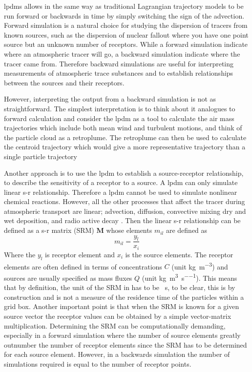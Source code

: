 \acrshort{lpdm}s allows in the same way as traditional Lagrangian trajectory 
models to be run forward or backwards in time by simply switching the sign of the advection. Forward 
simulation is a natural choice for studying the dispersion of tracers from known sources, such as the 
dispersion of nuclear fallout where you have one point source but an unknown number of receptors. While a 
forward simulation indicate where an atmospheric tracer will go, a backward simulation indicate where the 
tracer came from. Therefore backward simulations are useful for interpreting measurements of atmospheric 
trace substances and to establish relationships between the sources and their receptors. 

However, interpreting the output from a backward simulation is not as straightforward. The simplest interpretation is
to think about it analogues to forward calculation and consider the \acrshort{lpdm} as a tool to calculate the air mass 
trajectories which include both mean wind and turbulent motions, and think of the particle cloud as a 
retroplume. The retroplume can then be used to calculate the centroid trajectory which would give a more 
representative trajectory than a single particle trajectory

Another approach is to use the \acrshort{lpdm} to establish a source-receptor relationship, to describe the sensitivity of a 
receptor to a source. A \acrshort{lpdm} can only simulate linear s-r relationship. Therefore a \acrshort{lpdm} cannot be used to 
simulate nonlinear chemical reactions. However, all the other processes that affect the tracer during 
atmospheric transport are linear; advection, diffusion, convective mixing dry and wet deposition, and radio 
active decay \parencite{seibert2004source}. Then the linear s-r relationship  can be defined as a s-r matrix 
(SRM) $\mathbf{M}$ whose elements $m_{il}$ are defined as
\begin{equation}\label{eq:s-r_relationship}
    m_{il} = \frac{y_l}{x_i}
\end{equation}
Where the $y_l$ is receptor element and $x_i$ is the source elements. The receptor elements are often 
defined in terms of concentrations $C$ (unit \si{\kg\per\cubic\metre}) and sources are usually specified as 
mass fluxes $Q$ (unit \si{\kg\per\cubic\metre\per\s}). 
This means that by definition, the unit of the SRM in  has to be \si{\per\s}, to be clear, this is by construction and is not a measure of the residence time of the particles within a grid box. Another important point is that when the SRM is known for a given source vector the receptor values can be obtained by a simple vector-matrix multiplication. Determining the SRM can be computationally demanding, especially in a forward simulation where the number of source elements greatly outnumber the number of receptor elements since the SRM has to be determined for each source element. However, in a backwards simulation the number of simulations required is equal to the number of receptor points. 

